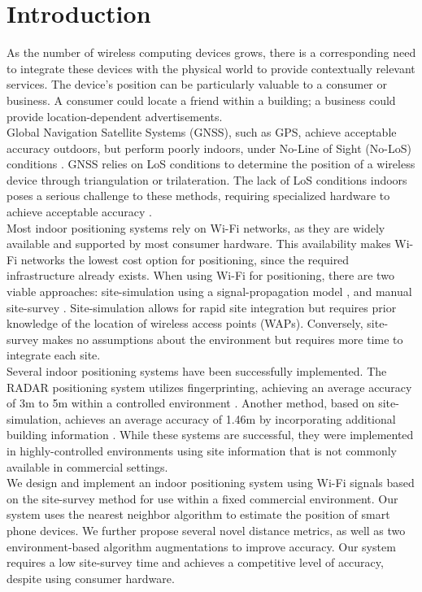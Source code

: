 \documentclass[conference]{IEEEtran}
\begin{document}
\section{Introduction}
As the number of wireless computing devices grows, there is a corresponding need to integrate these devices with the physical world to provide contextually relevant services. The device's position can be particularly valuable to a consumer or business. A consumer could locate a friend within a building; a business could provide location-dependent advertisements.\\
\indent Global Navigation Satellite Systems (GNSS), such as GPS, achieve acceptable accuracy outdoors, but perform poorly indoors, under No-Line of Sight (No-LoS) conditions  \cite{Lakmali}. GNSS relies on LoS conditions to determine the position of a wireless device through triangulation or trilateration. The lack of LoS conditions indoors poses a serious challenge to these methods, requiring specialized hardware to achieve acceptable accuracy \cite{Liu}. \\
\indent Most indoor positioning systems rely on Wi-Fi networks, as they are widely available and supported by most consumer hardware. This availability makes Wi-Fi networks the lowest cost option for positioning, since the required infrastructure already exists. When using Wi-Fi for positioning, there are two viable approaches: site-simulation using a signal-propagation model \cite{Kokkinis}, and manual site-survey \cite{Chaudhuri}. Site-simulation allows for rapid site integration but requires prior knowledge of the location of wireless access points (WAPs). Conversely, site-survey makes no assumptions about the environment but requires more time to integrate each site. \\
\indent Several indoor positioning systems have been successfully implemented. The RADAR positioning system utilizes fingerprinting, achieving an average accuracy of 3m to 5m within a controlled environment \cite{Bahl}. Another method, based on site-simulation, achieves an average accuracy of 1.46m by incorporating additional building information \cite{Kokkinis}. While these systems are successful, they were implemented in highly-controlled environments using site information that is not commonly available in commercial settings.\\
\indent We design and implement an indoor positioning system using Wi-Fi signals based on the site-survey method for use within a fixed commercial environment. Our system uses the nearest neighbor algorithm to estimate the position of smart phone devices. We further propose several novel distance metrics, as well as two environment-based algorithm augmentations to improve accuracy. Our system requires a low site-survey time and achieves a competitive level of accuracy, despite using consumer hardware.\\
\end{document}
